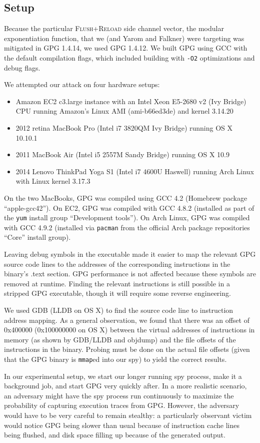 \documentclass[11pt]{llncs}
\newcommand{\flushreload}{\textsc{Flush}+\textsc{Reload}}
\newcommand{\litem}{\item[\lobclaw{simple}] }
\begin{document}
\subsection{Setup}

Because the particular \flushreload{} side channel vector, the modular
exponentiation function, that we (and Yarom and Falkner\cite{YF13}) were
targeting was mitigated in GPG 1.4.14, we used GPG 1.4.12. We built GPG 
using GCC with the default compilation flags, which included
building with \texttt{-O2} optimizations and debug flags.

We attempted our attack on four hardware setups:
\begin{itemize}
    \litem Amazon EC2 c3.large instance with an Intel Xeon E5-2680 v2 (Ivy
        Bridge) CPU running Amazon's Linux AMI (ami-b66ed3de) and kernel 3.14.20
    \litem 2012 retina MacBook Pro (Intel i7 3820QM Ivy Bridge) running OS X
        10.10.1
    \litem 2011 MacBook Air (Intel i5 2557M Sandy Bridge) running OS X 10.9
    \litem 2014 Lenovo ThinkPad Yoga S1 (Intel i7 4600U Haswell) running Arch
        Linux with Linux kernel 3.17.3
\end{itemize}

On the two MacBooks, GPG was compiled using GCC 4.2 (Homebrew package
``apple-gcc42''). On EC2, GPG was compiled with GCC 4.8.2 (installed as part of
the \texttt{yum} install group ``Development tools''). On Arch Linux, GPG was
compiled with GCC 4.9.2 (installed via \texttt{pacman} from the official Arch
package repositories ``Core'' install group).

Leaving debug symbols in the executable made it easier to map the relevant GPG
source code lines to the addresses of the corresponding instructions in the
binary's .text section. GPG performance is not affected because these symbols
are removed at runtime. Finding the relevant instructions is still possible in a
stripped GPG executable, though it will require some reverse engineering.

We used GDB (LLDB on OS X) to find the source code line to instruction address
mapping. As a general observation, we found that there was an offset of 0x400000
(0x100000000 on OS X) between the virtual addresses of instructions in memory
(as shown by GDB/LLDB and objdump) and the file offsets of the instructions in
the binary. Probing must be done on the actual file offsets (given that the GPG
binary is \texttt{mmap}ed into our spy) to yield the correct results.

In our experimental setup, we start our longer running spy process, make it a
background job, and start GPG very quickly after. In a more realistic scenario,
an adversary might have the spy process run continuously to maximize the
probability of capturing execution traces from GPG. However, the adversary would
have to be very careful to remain stealthy: a particularly observant victim
would notice GPG being slower than usual because of instruction cache lines
being flushed, and disk space filling up because of the generated output.
\end{document}
